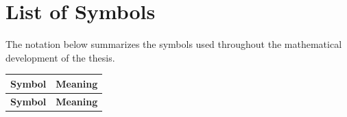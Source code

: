 \chapter*{List of Symbols}

The notation below summarizes the symbols used throughout the mathematical development of the thesis.

\begin{longtable}{@{}>{\raggedright\arraybackslash}p{} p{}@{}}
	\textbf{Symbol}                                    & \textbf{Meaning}                                                                                                                                                                                                   \\
	\hline
	\endfirsthead
	\textbf{Symbol}                                    & \textbf{Meaning}                                                                                                                                                                                                   \\
	\hline
	\endhead


\end{longtable}
